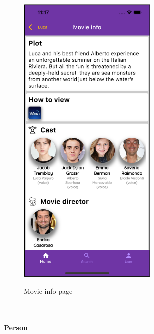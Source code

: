 \documentclass[12pt, a4paper]{article}
\numberwithin{figure}{section}
\begin{document}
\begin{center}
\begin{minipage}[t]{0.4\textwidth}
\begin{figure}[H]
			\includegraphics[width=0.6\textwidth]{images/final/movieInfo.png}\\
			\caption{Movie info page}
		\end{figure}
	\end{minipage}
\end{center}

\mbox{}\\

\paragraph{Person}
\end{document}
